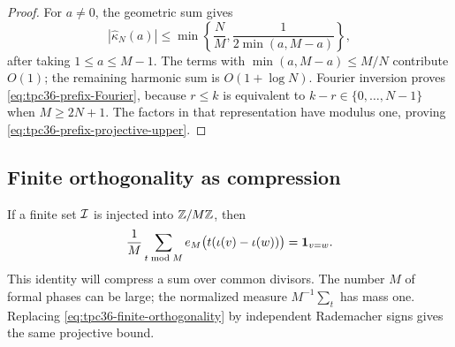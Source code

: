 \begin{proof}
For \(a\ne0\), the geometric sum gives
\begin{equation}
 |\widehat\kappa_N(a)|
 \le\min\left\{\frac NM,
 \frac1{2\min(a,M-a)}\right\},
 \label{eq:tpc36-Dirichlet-bound}
\end{equation}
after taking \(1\le a\le M-1\).  The terms with
\(\min(a,M-a)\le M/N\) contribute \(O(1)\); the remaining harmonic sum
is \(O(1+\log N)\).  Fourier inversion proves
\eqref{eq:tpc36-prefix-Fourier}, because \(r\le k\) is equivalent to
\(k-r\in\{0,\ldots,N-1\}\) when \(M\ge2N+1\).  The factors in that
representation have modulus one, proving
\eqref{eq:tpc36-prefix-projective-upper}.
\end{proof}

\subsection{Finite orthogonality as compression}

If a finite set \(\mathcal I\) is injected into \(\mathbb Z/M\mathbb Z\), then
\begin{equation}
 \frac1M\sum_{t\bmod M}
 e_M\bigl(t(\iota(v)-\iota(w))\bigr)=\mathbf 1_{v=w}.
 \label{eq:tpc36-finite-orthogonality}
\end{equation}
This identity will compress a sum over common divisors.  The number \(M\)
of formal phases can be large; the normalized measure \(M^{-1}\sum_t\)
has mass one.  Replacing \eqref{eq:tpc36-finite-orthogonality} by
independent Rademacher signs gives the same projective bound.
